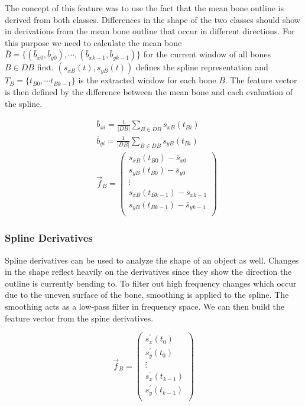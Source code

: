 \documentclass[pdftex,12pt,a4paper]{report}
\begin{document}
The concept of this feature was to use the fact that the mean bone outline is derived from both classes.
Differences in the shape of the two classes should show in derivations from the mean bone outline that
occur in different directions. For this purpose we need to calculate the mean bone $\bar{B} = \{ (\bar{b}_{x0}, \bar{b}_{y0}), \cdots, (\bar{b}_{xk-1}, \bar{b}_{yk-1}) \}$ for the current window of all bones $B \in DB$ first. $(s_{xB}(t), s_{yB}(t))$ defines the spline representation and $T_B = \{ t_{B0}, \cdots t_{Bk-1} \}$ is the extracted window for each bone $B$. The feature vector is then defined by the difference between the mean bone and
each evaluation of the spline.

\begin{equation}
\begin{split}
& \bar{b}_{xi} = \frac{1}{|DB|} \sum_{B \in DB} s_{xB}(t_{Bi}) \\
& \bar{b}_{yi} = \frac{1}{|DB|} \sum_{B \in DB} s_{yB}(t_{Bi}) \\
& \vec{f}_B = \left( \begin{array}{c}
s_{xB}(t_{B0}) - \bar{s}_{x0} \\
s_{yB}(t_{B0}) - \bar{s}_{y0} \\
\vdots \\
s_{xB}(t_{Bk-1}) - \bar{s}_{xk-1} \\
s_{yB}(t_{Bk-1}) - \bar{s}_{yk-1} \\
\end{array} \right)  
\end{split}
\end{equation}

\subsubsection{Spline Derivatives}

Spline derivatives can be used to analyze the shape of an object as well. Changes in the shape reflect heavily
on the derivatives since they show the direction the outline is currently bending to. To filter out high frequency
changes which occur due to the uneven surface of the bone, smoothing is applied to the spline. The smoothing acts as a low-pass filter in frequency space. We can then build the feature vector from the spine derivatives.

\begin{equation}
\vec{f}_B = \left( \begin{array}{c}
s^\prime_{x}(t_{0}) \\
s^\prime_{y}(t_{0}) \\
\vdots \\
s^\prime_{x}(t_{k-1}) \\
s^\prime_{y}(t_{k-1}) \\
\end{array} \right)  
\end{equation}
\end{document}
